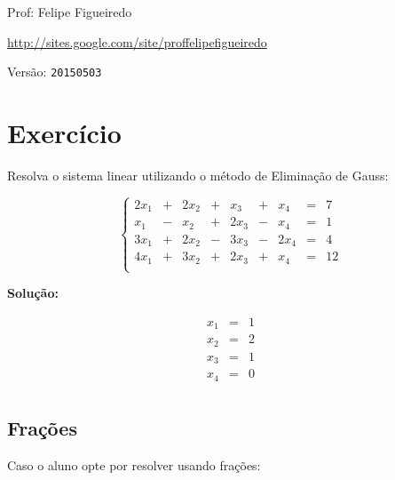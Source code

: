 \documentclass[a4paper]{article}
\begin{document}
\parbox[c]{.825\textwidth}{\raggedright%
{Prof: Felipe Figueiredo\par}
{\url{http://sites.google.com/site/proffelipefigueiredo}\par}
}

Versão: \verb|20150503|




\section{Exercício}

Resolva o sistema linear utilizando o método de Eliminação de Gauss:

\begin{displaymath}
  \left\{
    \begin{array}{ccccccccc}
      2 x_1 &+& 2 x_2  &+&  x_3 &+& x_4 &=&7\\
      x_1 &-& x_2 &+& 2 x_3 &-& x_4 &=&1\\
      3 x_1 &+& 2 x_2 &-& 3 x_3 &-& 2 x_4&=& 4\\
      4 x_1 &+& 3 x_2  &+& 2 x_3 &+& x_4 &=&12\\
    \end{array}
\right.
\end{displaymath}

{\bf Solução:}

\begin{displaymath}
  \begin{array}{ccc}
      x_1 &=& 1\\
      x_2 &=& 2\\
      x_3 &=& 1\\
      x_4 &=& 0\\
  \end{array}
\end{displaymath}

\subsection{Frações}

Caso o aluno opte por resolver usando frações:
\end{document}
